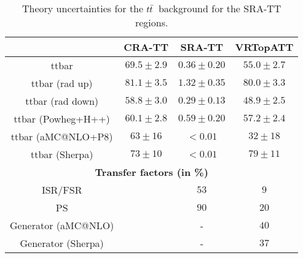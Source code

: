 \begin{description}
  \begin{table}[!h]
    \begin{center} \footnotesize
      \begin{tabular}{|c|c|c|c|}
        \hline
        & CRA-TT & SRA-TT & VRTopATT\\
        \hline
        ttbar&   $69.5\pm 2.9 $&         $0.36\pm 0.20 $&        $55.0\pm 2.7 $\\
        ttbar (rad up)&          $81.1\pm 3.5 $&         $1.32\pm 0.35 $&        $80.0\pm 3.3 $\\
        ttbar (rad down)&        $58.8\pm 3.0 $&         $0.29\pm 0.13 $&        $48.9\pm 2.5 $\\
        ttbar (Powheg+H++)&      $60.1\pm 2.8 $&         $0.59\pm 0.20 $&        $57.2\pm 2.4 $\\
        ttbar (aMC@NLO+P8)&      $63\pm 16 $&    $<0.01$&        $32\pm 18 $\\
        ttbar (Sherpa)&          $73\pm 10 $&    $<0.01$&        $79\pm 11 $\\
        \hline
        \multicolumn{4}{c}{\bf Transfer factors (in \%)} \\ \hline
        ISR/FSR & &        $53$&   $9$\\
        PS & &        $90$&   $20$\\
        Generator (aMC@NLO) & & - & $40$\\
        Generator (Sherpa) & & - & $37$\\
        \hline
        \end{tabular}
    \end{center}
    \caption{Theory uncertainties for the $t\bar{t}$\ background for the SRA-TT regions.}
    \label{tab:ttbar_unc_SRA_TT}
  \end{table}


\end{description}
